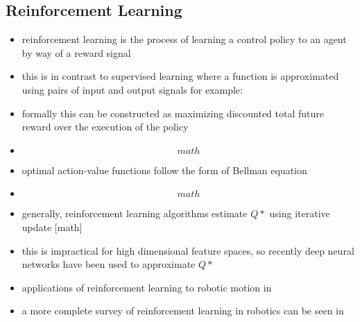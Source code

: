 \documentclass[paper=a4, fontsize=11pt]{scrartcl} %
\begin{document}
	\subsection{Reinforcement Learning}
	\begin{itemize}
		\item reinforcement learning is the process of learning a control policy to an agent by way of a reward signal
		\item this is in contrast to supervised learning where a function is approximated using pairs of input and output signals for example: \cite{Ross2013}
		\item formally this can be constructed as maximizing discounted total future reward over the execution of the policy
		\item \[math\]
		\item optimal action-value functions follow the form of Bellman equation
		\item \[math\]
		\item generally, reinforcement learning algorithms estimate $Q*$ using iterative update [math] \cite{Sutton:1998:IRL:551283}
		\item this is impractical for high dimensional feature spaces, so recently deep neural networks have been used to approximate $Q*$ \cite{Mnih2013}
		\item applications of reinforcement learning to robotic motion in \cite{DBLP:conf/icra/KohlS04,DBLP:conf/iros/TedrakeZS04,geng2005fast,bagnell2001autonomous, riedmiller2009reinforcement}
		\item a more complete survey of reinforcement learning in robotics can be seen in \cite{kober2013reinforcement}
	\end{itemize}
\end{document}
